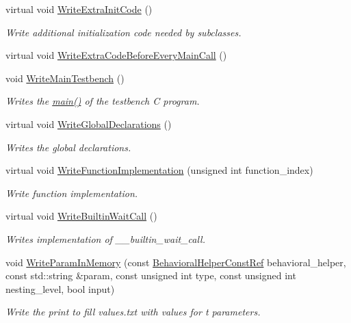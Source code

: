 \begin{DoxyCompactItemize}
virtual void \hyperlink{classHLSCWriter_a05886037980c7ec5aa2df5880081682c}{Write\+Extra\+Init\+Code} ()
\begin{DoxyCompactList}\small\item\em Write additional initialization code needed by subclasses. \end{DoxyCompactList}\item 
virtual void \hyperlink{classHLSCWriter_a3b1718b9bd4cf44bf5c9e73af2b25986}{Write\+Extra\+Code\+Before\+Every\+Main\+Call} ()
\item 
void \hyperlink{classHLSCWriter_a169bdc6b181d083f9e4eb033f2da65da}{Write\+Main\+Testbench} ()
\begin{DoxyCompactList}\small\item\em Writes the \hyperlink{test__degree__coloring_8cpp_a0ddf1224851353fc92bfbff6f499fa97}{main()} of the testbench C program. \end{DoxyCompactList}\item 
virtual void \hyperlink{classHLSCWriter_a6ea23b34e9d1bde20adbef400db94c6f}{Write\+Global\+Declarations} ()
\begin{DoxyCompactList}\small\item\em Writes the global declarations. \end{DoxyCompactList}\item 
virtual void \hyperlink{classHLSCWriter_a2379e428afbccc4b235dca4ae28dbaf5}{Write\+Function\+Implementation} (unsigned int function\+\_\+index)
\begin{DoxyCompactList}\small\item\em Write function implementation. \end{DoxyCompactList}\item 
virtual void \hyperlink{classHLSCWriter_a7261192f62610bd053e5c35361ae1054}{Write\+Builtin\+Wait\+Call} ()
\begin{DoxyCompactList}\small\item\em Writes implementation of \+\_\+\+\_\+builtin\+\_\+wait\+\_\+call. \end{DoxyCompactList}\item 
void \hyperlink{classHLSCWriter_a878ff97c2a1428574b641d4ef2704b76}{Write\+Param\+In\+Memory} (const \hyperlink{behavioral__helper_8hpp_aae973b54cac87eef3b27442aa3e1e425}{Behavioral\+Helper\+Const\+Ref} behavioral\+\_\+helper, const std\+::string \&param, const unsigned int type, const unsigned int nesting\+\_\+level, bool input)
\begin{DoxyCompactList}\small\item\em Write the print to fill values.\+txt with values for t parameters. \end{DoxyCompactList}\end{DoxyCompactItemize}
